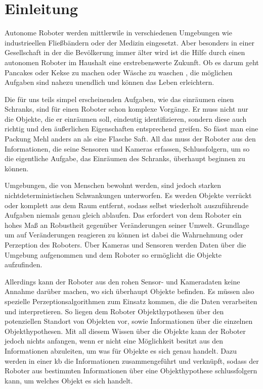 \graphicspath{{./images/}}      
\def\CHAPTERONE{./chapters/Chapter-1} 

\chapter{Einleitung}
\label{chap:introduction}
%	
Autonome Roboter werden mittlerwile in verschiedenen Umgebungen wie industrieellen Fließbändern oder der Medizin eingesetzt. Aber besonders in einer Gesellschaft in der die Bevölkerung immer älter wird \cite{peopleGetOlder} ist die Hilfe durch einen autonomen Roboter im Haushalt eine erstrebenswerte Zukunft. Ob es darum geht Pancakes \cite{beetzPancake} oder Kekse \cite{bakeBot} zu machen oder Wäsche zu waschen \cite{laundry}, die möglichen Aufgaben sind nahezu unendlich und können das Leben erleichtern. \par
Die für uns teils simpel erscheinenden Aufgaben, wie das einräumen einen Schranks, sind für einen Roboter schon komplexe Vorgänge. Er muss nicht nur die Objekte, die er einräumen soll, eindeutig identifizieren, sondern diese auch richtig und den äußerlichen Eigenschaften entsprechend greifen. So fässt man eine Packung Mehl anders an als eine Flasche Saft. All das muss der Roboter aus den Informationen, die seine Sensoren und Kameras erfassen, Schlussfolgern, um so die eigentliche Aufgabe, das Einräumen des Schranks, überhaupt beginnen zu können. \par
Umgebungen, die von Menschen bewohnt werden, sind jedoch starken nichtdeterministischen Schwankungen unterworfen. Es werden Objekte verrückt oder komplett aus dem Raum entfernt, sodass selbst wiederholt auszuführende Aufgaben niemals genau gleich ablaufen. Das erfordert von dem Roboter ein hohes Maß an Robustheit gegenüber Veränderungen seiner Umwelt. Grundlage um auf Veränderungen reagieren zu können ist dabei die Wahrnehmung oder Perzeption des Roboters. Über Kameras und Sensoren werden Daten über die Umgebung aufgenommen und dem Roboter so ermöglicht die Objekte aufzufinden. \par 
Allerdings kann der Roboter aus den rohen Sensor- und Kameradaten keine Annahme darüber machen, wo sich überhaupt Objekte befinden. Es müssen also spezielle Perzeptionsalgorithmen zum Einsatz kommen, die die Daten verarbeiten und interpretieren. So liegen dem Roboter Objekthypothesen über den potenziellen Standort von Objekten vor, sowie Informationen über die einzelnen Objekthypothesen. Mit all diesem Wissen über die Objekte kann der Roboter jedoch nichts anfangen, wenn er nicht eine Möglichkeit besitzt aus den Informationen abzuleiten, um was für Objekte es sich genau handelt. Dazu werden in einer \gls{kb} die Informationen zusammengeführt und verknüpft, sodass der Roboter aus bestimmten Informationen über eine Objekthypothese schlussfolgern kann, um welches Objekt es sich handelt.    \par    
